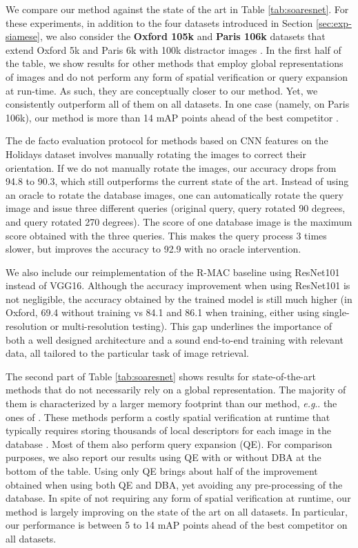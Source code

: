 \documentclass[twocolumn]{svjour3}          \smartqed  \usepackage{graphicx}
\makeatletter
\DeclareRobustCommand\onedot{\futurelet\@let@token\@onedot}
\def\@onedot{\ifx\@let@token.\else.\null\fi\xspace}
\def\eg{\emph{e.g}\onedot} \def\Eg{\emph{E.g}\onedot}
\makeatother
\begin{document}
We compare our method against the state of the art in Table \ref{tab:soaresnet}.
For these experiments, in addition to the four datasets introduced in Section \ref{sec:exp-siamese}, we also consider the \textbf{Oxford 105k} and \textbf{Paris 106k}
datasets that extend Oxford 5k and Paris 6k with 100k distractor images \citep{Philbin2007}.
In the first half of the table, we show results for other methods that employ global representations of images and do not perform any form of spatial verification or query expansion at run-time.
As such, they are conceptually closer to our method.
Yet, we consistently outperform all of them on all datasets. 
In one case (namely, on Paris 106k), our method is more than 14 mAP points ahead of the best competitor \citep{Radenovic2016}.

The de facto evaluation protocol for methods based on CNN features on the Holidays dataset involves manually rotating the images to correct their orientation.
If we do not manually rotate the images, our accuracy drops from 94.8 to 90.3, which still outperforms the current state of the art.
Instead of using an oracle to rotate the database images, one can automatically rotate the query image and issue three different queries (original query, query rotated 90 degrees, and query rotated 270 degrees). The score of one database image is the maximum score obtained with the three queries. This makes the query process 3 times slower, but improves the accuracy to 92.9 with no oracle intervention. 

We also include our reimplementation of the R-MAC baseline \citep{Tolias2016} using ResNet101 instead of VGG16.
Although the accuracy improvement when using ResNet101 is not negligible, the accuracy obtained by the trained model is still much higher (in Oxford, 69.4 without training vs 84.1 and 86.1 when training, either using single-resolution or multi-resolution testing). 
This gap underlines the importance of both a well designed architecture and a sound end-to-end training with relevant data, all tailored to the particular task of image retrieval.

The second part of Table \ref{tab:soaresnet} shows results for state-of-the-art methods that do not necessarily rely on a global representation. 
The majority of them is characterized by a larger memory footprint than our method, \eg the ones of \cite{Tolias2015b, Tolias2016, Danfeng2011, Azizpour2015}. These methods perform a costly spatial verification at runtime that typically requires storing thousands of local descriptors for each image in the database \citep{Tolias2015b, Xinchao2015, Mikulik2013}. 
Most of them also perform query expansion (QE). For comparison purposes, we also report our results using QE with or without  DBA at the bottom of the table. Using only QE brings about half of the improvement obtained when using both QE and DBA, yet avoiding any pre-processing of the database. In spite of not requiring any form of spatial verification at runtime, our method is
 largely improving on the state of the art on all datasets. In particular, our performance is between 5 to 14 mAP points ahead of the best competitor on all datasets.
 
\end{document}

